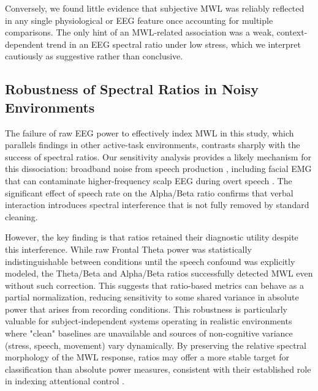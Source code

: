 \documentclass[lettersize,journal]{IEEEtran}
\begin{document}
Conversely, we found little evidence that subjective MWL was reliably reflected in any single physiological or EEG feature once accounting for multiple comparisons. The only hint of an MWL-related association was a weak, context-dependent trend in an EEG spectral ratio under low stress, which we interpret cautiously as suggestive rather than conclusive.


\subsection{Robustness of Spectral Ratios in Noisy Environments}

The failure of raw EEG power to effectively index MWL in this study, which parallels findings in other active-task environments, contrasts sharply with the success of spectral ratios. Our sensitivity analysis provides a likely mechanism for this dissociation: broadband noise from speech production \cite{goncharova_emg_2003}, including facial EMG that can contaminate higher-frequency scalp EEG during overt speech \cite{whithamScalpElectricalRecordingParalysis2007, deVosRemovalMuscleArtifactsSpokenLanguage2010}. The significant effect of speech rate on the Alpha/Beta ratio confirms that verbal interaction introduces spectral interference that is not fully removed by standard cleaning. 

However, the key finding is that ratios retained their diagnostic utility despite this interference. While raw Frontal Theta power was statistically indistinguishable between conditions until the speech confound was explicitly modeled, the Theta/Beta and Alpha/Beta ratios successfully detected MWL even without such correction. This suggests that ratio-based metrics can behave as a partial normalization, reducing sensitivity to some shared variance in absolute power that arises from recording conditions. This robustness is particularly valuable for subject-independent systems operating in realistic environments where "clean" baselines are unavailable and sources of non-cognitive variance (stress, speech, movement) vary dynamically. By preserving the relative spectral morphology of the MWL response, ratios may offer a more stable target for classification than absolute power measures, consistent with their established role in indexing attentional control \cite{putman_eeg_2014}.
\end{document}
